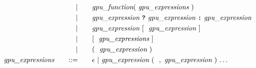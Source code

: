 \begin{alignat*}{9}
    &&  && |    &\quad &&  \textit{gpu\_function} ( \  \textit{gpu\_expressions} \ ) \\
    &&  && |    &\quad &&  \textit{gpu\_expression} \ \textbf{\texttt{?}} \ \textit{gpu\_expression} \ \textbf{\texttt{:}} \ \textit{gpu\_expression} \\
    &&  && |    &\quad &&  \textit{gpu\_expression} \ [ \ \ \textit{gpu\_expression} \ ] \ \\
    &&  && |    &\quad && [ \ \ \textit{gpu\_expressions} \ ] \ \\
    &&  && |    &\quad && ( \ \ \textit{gpu\_expression} \ ) \ \\
    && \textit{gpu\_expressions} 
    &&\quad ::= &\quad 
    && \epsilon \ | \ \textit{gpu\_expression} \ ( \ \ , \ \textit{gpu\_expression} \ )
    \ {\ldots}
    \end{alignat*}